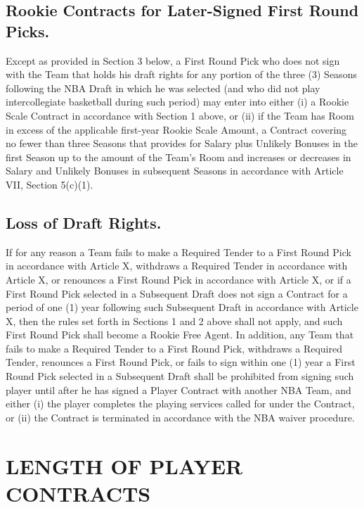 \documentclass[
]{book}
\begin{document}
\hypertarget{rookie-contracts-for-later-signed-first-round-picks.}{%
\section{Rookie Contracts for Later-Signed First Round Picks.}\label{rookie-contracts-for-later-signed-first-round-picks.}}

Except as provided in Section 3 below, a First Round Pick who does not sign with the Team that holds his draft rights for any portion of the three (3) Seasons following the NBA Draft in which he was selected (and who did not play intercollegiate basketball during such period) may enter into either (i) a Rookie Scale Contract in accordance with Section 1 above, or (ii) if the Team has Room in excess of the applicable first-year Rookie Scale Amount, a Contract covering no fewer than three Seasons that provides for Salary plus Unlikely Bonuses in the first Season up to the amount of the Team's Room and increases or decreases in Salary and Unlikely Bonuses in subsequent Seasons in accordance with Article VII, Section 5(c)(1).

\hypertarget{loss-of-draft-rights.}{%
\section{Loss of Draft Rights.}\label{loss-of-draft-rights.}}

If for any reason a Team fails to make a Required Tender to a First Round Pick in accordance with Article X, withdraws a Required Tender in accordance with Article X, or renounces a First Round Pick in accordance with Article X, or if a First Round Pick selected in a Subsequent Draft does not sign a Contract for a period of one (1) year following such Subsequent Draft in accordance with Article X, then the rules set forth in Sections 1 and 2 above shall not apply, and such First Round Pick shall become a Rookie Free Agent. In addition, any Team that fails to make a Required Tender to a First Round Pick, withdraws a Required Tender, renounces a First Round Pick, or fails to sign within one (1) year a First Round Pick selected in a Subsequent Draft shall be prohibited from signing such player until after he has signed a Player Contract with another NBA Team, and either (i) the player completes the playing services called for under the Contract, or (ii) the Contract is terminated in accordance with the NBA waiver procedure.

\hypertarget{length-of-player-contracts}{%
\chapter{LENGTH OF PLAYER CONTRACTS}\label{length-of-player-contracts}}
\end{document}
